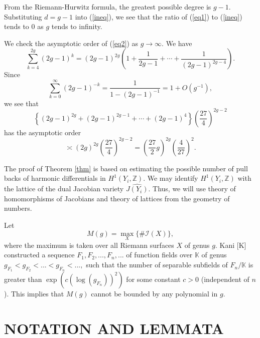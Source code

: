\documentclass[11pt]{article}
\numberwithin{equation}{section}
\theoremstyle{plain}
\begin{document}
From the Riemann-Hurwitz formula, the greatest possible degree is $g-1$.
Substituting $d=g-1$ into (\ref{ineq}), 
we see that the ratio of (\ref{eq1}) to (\ref{ineq}) tends to \(0\) as \(g\) tends to infinity.



We check the asymptotic order of (\ref{eq2}) as 
$g\to\infty$.
We have
$$
\sum_{k=4}^{2g}(2g-1)^k
=
(2g-1)^{2g}
\left(
1+\frac{1}{2g-1}+\cdots+\frac{1}{(2g-1)^{2g-4}}
\right).
$$
Since
$$\sum_{k=0}^{\infty}(2g-1)^{-k}
=
\frac{1}{1-(2g-1)^{-1}}
=
1+O(g^{-1}),$$
we see that
$$
\left\{
(2g-1)^{2g}
+(2g-1)^{2g-1}
+\cdots
+(2g-1)^4
\right\}
\left(\frac{27}{4}\right)^{2g-2}
$$
has the asymptotic order
$$
\asymp
(2g)^{2g}
\left(\frac{27}{4}\right)^{2g-2}=\left(\frac{27}{2}g\right)^{2g}\left(\frac{4}{27}\right)^{2}.
$$

 The proof of Theorem \ref{thm} is based on estimating the possible number of pull backs of harmonic differentials in $H^{1}(Y_{i},\mathbb{Z})$. We may identify $H^{1}(Y_{i},\mathbb{Z})$ with the lattice of the dual Jacobian variety $\widehat{J(Y_{i})}$. Thus, we will use theory of homomorphisms of Jacobians and theory of lattices from the geometry of numbers. 

 Let 
\begin{equation*}
M(g) = \max_X \{\#\mathcal{I}(X)\}, 
\end{equation*}
where the maximum is taken over all Riemann surfaces $X$ of genus $g$.
Kani [K]  constructed a sequence $F_{1},F_{2},...,F_{n},...$ of function fields over $\mathbb{K}$ of genus $g_{F_{1}}<g_{F_{2}}<...<g_{F_{n}}<...,$ such that the number of separable subfields of $F_{n}/\mathbb{K}$ is greater than $\exp (c(\log(g_{F_{n}}))^{2})$ for some constant $c>0$ (independent of $n$).  This implies that $M(g)$ cannot be bounded by any polynomial in $g$. 


\section{NOTATION AND LEMMATA} 
\end{document}
